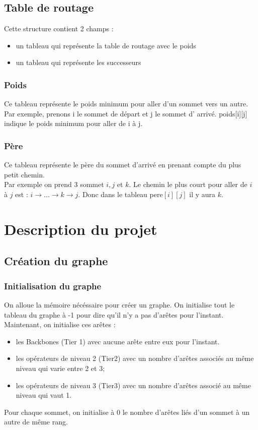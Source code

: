 \documentclass[a4paper,11pt]{report}
\begin{document}
\section{Table de routage}

Cette structure contient 2 champs : 
\begin{itemize}
    \item un tableau qui représente la table de routage avec le poids
    \item un tableau qui représente les successeurs 
\end{itemize}

\subsection{Poids}

Ce tableau représente le poids minimum pour aller d'un sommet vers un autre. Par exemple, prenons i le sommet de départ et j le sommet d' arrivé. poids[i][j] indique le poids minimum pour aller de i à j.

\subsection{Père}

Ce tableau représente le père du sommet d'arrivé en prenant compte du plus petit chemin.\\
Par exemple on prend 3 sommet $i, j$ et $k$. Le chemin le plus court pour aller de $i$ à $j$ est : $i \rightarrow ... \rightarrow k \rightarrow j$. Donc dans le tableau pere$[i][j]$ il y aura $k$.

\chapter{Description du projet}

\section{Création du graphe}

\subsection{Initialisation du graphe}
On alloue la mémoire nécéssaire pour créer un graphe. On initialise tout le tableau du graphe à -1 pour dire qu'il n'y a pas d'arêtes pour l'instant. Maintenant, on initialise ces arêtes :
\begin{itemize}
\item les Backbones (Tier 1) avec aucune arête entre eux pour l'instant.
\item les opérateurs de niveau 2 (Tier2) avec un nombre d'arêtes associés au même niveau qui varie entre 2 et 3;
\item les opérateurs de niveau 3 (Tier3) avec un nombre d'arêtes associé au même niveau qui vaut 1.
\end{itemize}
Pour chaque sommet, on initialise à 0 le nombre d'arêtes liés d'un sommet à un autre de même rang.
\end{document}
